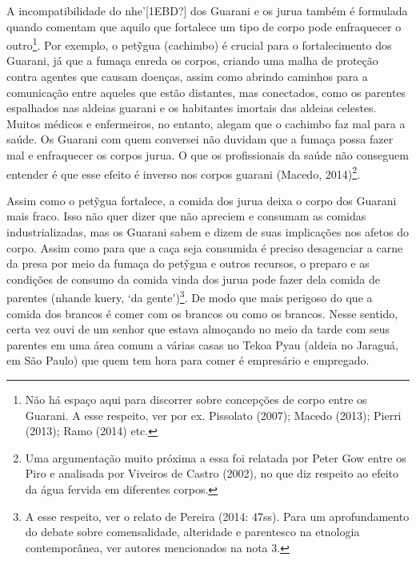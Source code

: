 \documentclass{article}
\begin{document}
A incompatibilidade do nhe{\textquoteright}[1EBD?] dos Guarani e os
jurua tamb\'em \'e formulada quando comentam que aquilo que fortalece
um tipo de corpo pode enfraquecer o outro\footnote{ N\~ao h\'a
espa\c{c}o aqui para discorrer sobre concep\c{c}\~oes de corpo entre os
Guarani. A esse respeito, ver por ex. Pissolato (2007); Macedo (2013);
Pierri (2013); Ramo (2014) etc.}. Por exemplo, o pet\~{y}gua (cachimbo)
\'e crucial para o fortalecimento dos Guarani, j\'a que a fuma\c{c}a
enreda os corpos, criando uma malha de prote\c{c}\~ao contra agentes
que causam doen\c{c}as, assim como abrindo caminhos para a
comunica\c{c}\~ao entre aqueles que est\~ao distantes, mas conectados,
como os parentes espalhados nas aldeias guarani e os habitantes
imortais das aldeias celestes. Muitos m\'edicos e enfermeiros, no
entanto, alegam que o cachimbo faz mal para a sa\'ude. Os Guarani com
quem conversei n\~ao duvidam que a fuma\c{c}a possa fazer mal e
enfraquecer os corpos jurua. O que os profissionais da sa\'ude n\~ao
conseguem entender \'e que esse efeito \'e inverso nos corpos guarani
(Macedo, 2014)\footnote{ Uma argumenta\c{c}\~ao muito pr\'oxima a essa
foi relatada por Peter Gow entre os Piro e analisada por Viveiros de
Castro (2002), no que diz respeito ao efeito da \'agua fervida em
diferentes corpos.}. 

Assim como o pet\~{y}gua fortalece, a comida dos jurua deixa o corpo dos
Guarani mais fraco. Isso n\~ao quer dizer que n\~ao apreciem e consumam
as comidas industrializadas, mas os Guarani sabem e dizem de suas
implica\c{c}\~oes nos afetos do corpo. Assim como para que a ca\c{c}a
seja consumida \'e preciso desagenciar a carne da presa por meio da
fuma\c{c}a do pet\~{y}gua e outros recursos, o preparo e as
condi\c{c}\~oes de consumo da comida vinda dos jurua pode fazer dela
comida de parentes (nhande kuery, {\textquoteleft}da
gente{\textquoteright})\footnote{ A esse respeito, ver o relato de
Pereira (2014: 47ss). Para um aprofundamento do debate sobre
comensalidade, alteridade e parentesco na etnologia contempor\^anea,
ver autores mencionados na nota 3.}. De modo que mais perigoso do que a
comida dos brancos \'e comer com os brancos ou como os brancos. Nesse
sentido, certa vez ouvi de um senhor que estava almo\c{c}ando no meio
da tarde com seus parentes em uma \'area comum a v\'arias casas no
Tekoa Pyau (aldeia no Jaragu\'a, em S\~ao Paulo) que quem tem hora para
comer \'e empres\'ario e empregado.
\end{document}

